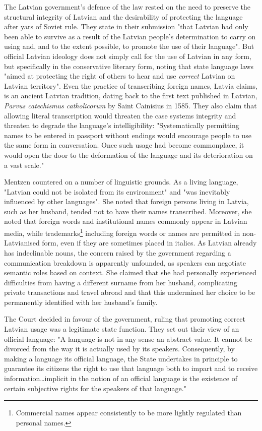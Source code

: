 The Latvian government's defence of the law rested on the need to preserve the structural integrity of Latvian and the desirability of protecting the language after yars of Soviet rule. They state in their submission "that Latvian had only been able to survive as a result of the Latvian people's determination to carry on using and, and to the extent possible, to promote the use of their language". But official Latvian ideology does not simply call for the use of Latvian in any form, but specifically in the conservative literary form, noting that state language laws "aimed at protecting the right of others to hear and use \textit{correct} Latvian on Latvian territory". Even the practice of transcribing foreign names, Latvia claims, is an ancient Latvian tradition, dating back to the first text published in Latvian, \textit{Parvus catechismus catholicorum} by Saint Cainisius in 1585. They also claim that allowing literal transcription would threaten the case systems integrity and threaten to degrade the language's intelligibility: "Systematically permitting names to be entered in passport without endings would encourage people to use the same form in conversation. Once such usage had become commonplace, it would open the door to the deformation of the language and its deterioration on a vast scale."

Mentzen countered on a number of linguistic grounds. As a living language, "Latvian could not be isolated from its environment" and "was inevitably influenced by other languages". She noted that foreign persons living in Latvia, such as her husband, tended not to have their names transcribed. Moreover, she noted that foreign words and institutional names commonly appear in Latvian media, while trademarks\footnote{Commercial names appear consistently to be more lightly regulated than personal names.\parencite{varennes15}}  including foreign words or names are permitted in non-Latvianised form, even if they are sometimes placed in italics. As Latvian already has indeclinable nouns, the concern raised by the government regarding a communication breakdown is apparently unfounded, as speakers can negotiate semantic roles based on context. She claimed that she had personally experienced difficulties from having a different surname from her husband, complicating private transactions and travel abroad and that this undermined her choice to be permanently identified with her husband's family.

The Court decided in favour of the government, ruling that promoting correct Latvian usage was a legitimate state function. They set out their view of an official language: "A language is not in any sense an abstract value. It cannot be divorced from the way it is actually used by its speakers. Consequently, by making a language its official language, the State undertakes in principle to guarantee its citizens the right to use that language both to impart and to receive information…implicit in the notion of an official language is the existence of certain subjective rights for the speakers of that language."

